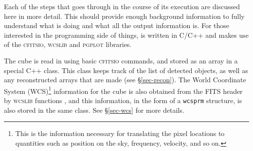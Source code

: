 %
%
%
%
\label{sec-flow}

Each of the steps that \duchamp goes through in the course of its
execution are discussed here in more detail. This should provide
enough background information to fully understand what \duchamp is
doing and what all the output information is. For those interested in
the programming side of things, \duchamp is written in C/C++ and makes
use of the \textsc{cfitsio}, \textsc{wcslib} and \textsc{pgplot}
libraries.

\label{sec-input}

The cube is read in using basic \textsc{cfitsio} commands, and stored
as an array in a special C++ class. This class keeps track of the list
of detected objects, as well as any reconstructed arrays that are made
(see \S\ref{sec-recon}). The World Coordinate System
(WCS)\footnote{This is the information necessary for translating the
  pixel locations to quantities such as position on the sky,
  frequency, velocity, and so on.} information for the cube is also
obtained from the FITS header by \textsc{wcslib} functions
\citep{greisen02, calabretta02,greisen06}, and this information, in
the form of a \texttt{wcsprm} structure, is also stored in the same
class. See \S\ref{sec-wcs} for more details.

